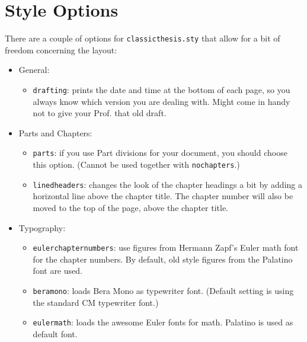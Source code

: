 \clearpage
\section{Style Options}\label{sec:options}
There are a couple of options for \texttt{classicthesis.sty} that
allow for a bit of freedom concerning the layout:
\begin{itemize}
    \item General:
        \begin{itemize}
            \item\texttt{drafting}: prints the date and time at the bottom of
            each page, so you always know which version you are dealing with.
            Might come in handy not to give your Prof. that old draft.
        \end{itemize}

    \item Parts and Chapters:
        \begin{itemize}
            \item\texttt{parts}: if you use Part divisions for your document,
            you should choose this option. (Cannot be used together with
            \texttt{nochapters}.)

            \item\texttt{linedheaders}: changes the look of the chapter
            headings a bit by adding a horizontal line above the chapter
            title. The chapter number will also be moved to the top of the
            page, above the chapter title.
        \end{itemize}

    \item Typography:
        \begin{itemize}
            \item\texttt{eulerchapternumbers}: use figures from Hermann Zapf's
            Euler math font for the chapter numbers. By default, old style
            figures from the Palatino font are used.

            \item\texttt{beramono}: loads Bera Mono as typewriter font.
            (Default setting is using the standard CM typewriter font.)

            \item\texttt{eulermath}: loads the awesome Euler fonts for math.
            Pala\-tino is used as default font.
        \end{itemize}


\end{itemize}
